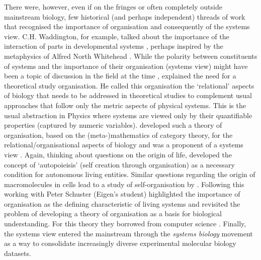 There were, however, even if on the fringes or often completely outside
mainstream biology, few historical (and perhaps independent) threads of work
that recognised the importance of organisation and consequently of the systems
view. C.H. Waddington, for example, talked about the importance of the
interaction of parts in developmental systems \citep{allen_evolution_1977},
perhaps inspired by the metaphysics of Alfred North Whitehead \citep[same
book;][Autobiographical note]{allen_evolution_1977}. While the polarity between
constituents of systems and the importance of their organisation (systems view)
might have been a topic of discussion in the field at the time
\citep{waddington_nature_1961}, \citet{rashness's_topology_1954} explained the
need for a theoretical study organisation. He called this organisation the
`relational' aspects of biology that needs to be addressed in theoretical
studies to complement usual approaches that follow only the metric aspects of
physical systems. This is the usual abstraction in Physics where systems are
viewed only by their quantifiable properties (captured by numeric
variables). \citet{rosen_relational_1958} developed such a theory of
organisation, based on the (meta-)mathematics of category theory, for the
relational/organisational aspects of biology and was a proponent of a systems
view \citep{rosen1991life}. Again, thinking about questions on the origin of
life, \citet{varela_autopoiesis:_1974} developed the concept of `autopoieisis'
(self creation through organisation) as a necessary condition for autonomous
living entities. Similar questions regarding the origin of macromolecules in
cells lead to a study of self-organisation by
\citet{eigen_selforganization_1971}. Following this \citet{fontana_what_1994}
working with Peter Schuster (Eigen's student) highlighted the importance of
organisation as the defining characteristic of living systems and revisited
the problem of developing a theory of organisation as a basis for biological
understanding. For this theory they borrowed from computer science
\citep[$\lambda$-calculus in particular;][]{fontana_barrier_1996}. Finally, the
systems view entered the mainstream through the \emph{systems biology} movement
\citep{kitano2002systems} as a way to consolidate increasingly diverse
experimental molecular biology datasets.

